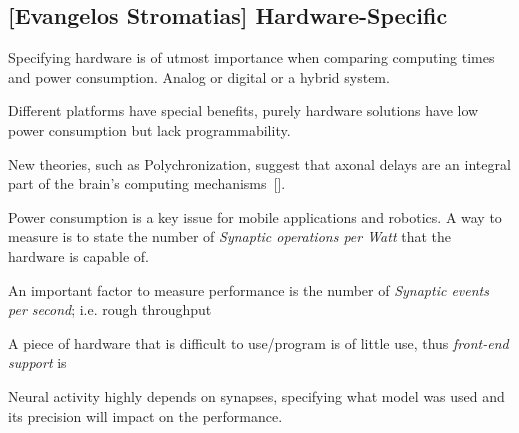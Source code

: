 \subsection{[Evangelos Stromatias] Hardware-Specific}
Specifying hardware is of utmost importance when comparing computing times and power consumption. Analog or digital or a hybrid system.

Different platforms have special benefits, purely hardware solutions have low power consumption but lack programmability.

New theories, such as Polychronization, suggest that axonal delays are an integral part of the brain's computing mechanisms~[\cite{Izhikevich2005}]. 

Power consumption is a key issue for mobile applications and robotics. A way to measure is to state the number of \emph{Synaptic operations per Watt} that the hardware is capable of.

An important factor to measure performance is the number of \emph{Synaptic events per second}; i.e. rough throughput

A piece of hardware that is difficult to use/program is of little use, thus \emph{front-end support} is

Neural activity highly depends on synapses, specifying what model was used and its precision will impact on the performance.

